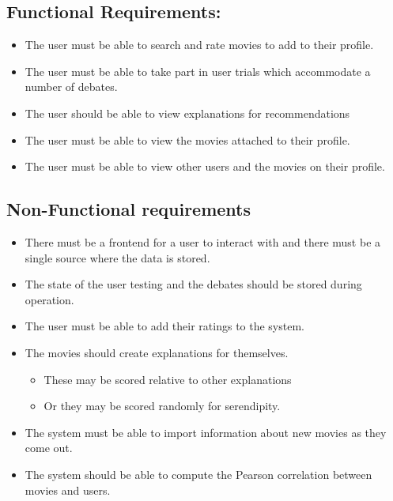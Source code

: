         \subsection{Functional Requirements:}
            \begin{itemize}

            \item The user must be able to search and rate movies to add to their profile.
            \item The user must be able to take part in user trials which accommodate a number of debates.
            \item The user should be able to view explanations for recommendations
            \item The user must be able to view the movies attached to their profile.
            \item The user must be able to view other users and the movies on their profile. 
            \end{itemize}
        \subsection{Non-Functional requirements}
            \begin{itemize}
                
            
            \item There must be a frontend for a user to interact with and there must be a single source where the data is stored. 
            \item The state of the user testing and the debates should be stored during operation.
            \item The user must be able to add their ratings to the system.
            \item The movies should create explanations for themselves. 
                \begin{itemize}
                    \item These may be scored relative to other explanations
                    \item Or they may be scored randomly for serendipity.
                \end{itemize}

            \item The system must be able to import information about new movies as they come out.
            \item The system should be able to compute the Pearson correlation between movies and users. 
            \end{itemize}
